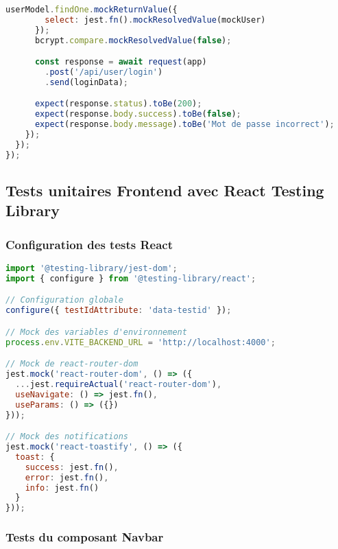 \begin{lstlisting}[language=JavaScript, caption=userController.test.js]
      userModel.findOne.mockReturnValue({
        select: jest.fn().mockResolvedValue(mockUser)
      });
      bcrypt.compare.mockResolvedValue(false);

      const response = await request(app)
        .post('/api/user/login')
        .send(loginData);

      expect(response.status).toBe(200);
      expect(response.body.success).toBe(false);
      expect(response.body.message).toBe('Mot de passe incorrect');
    });
  });
});
\end{lstlisting}

\subsection{Tests unitaires Frontend avec React Testing Library}

\subsubsection{Configuration des tests React}

\begin{lstlisting}[language=JavaScript, caption=setupTests.js]
import '@testing-library/jest-dom';
import { configure } from '@testing-library/react';

// Configuration globale
configure({ testIdAttribute: 'data-testid' });

// Mock des variables d'environnement
process.env.VITE_BACKEND_URL = 'http://localhost:4000';

// Mock de react-router-dom
jest.mock('react-router-dom', () => ({
  ...jest.requireActual('react-router-dom'),
  useNavigate: () => jest.fn(),
  useParams: () => ({})
}));

// Mock des notifications
jest.mock('react-toastify', () => ({
  toast: {
    success: jest.fn(),
    error: jest.fn(),
    info: jest.fn()
  }
}));
\end{lstlisting}

\subsubsection{Tests du composant Navbar}

